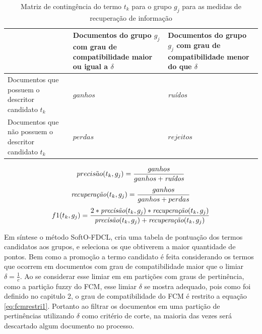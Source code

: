 \begin{table}[!htp]
  \centering
  \begin{tabular}{ |p{5cm}|p{5cm}|p{5cm}|}
    \cline{2-3}
    \multicolumn{1}{p{5cm}|}{} & Documentos do grupo $g_j$ com grau de compatibilidade 
    maior ou igual a $\delta$ &
    Documentos do grupo $g_j$ com grau de compatibilidade menor do que $\delta$ \\
    \hline
    Documentos que possuem o descritor candidato $t_k$ & \parbox[c]{5cm}{\centering $ganhos$} &
    \parbox[c]{5cm}{\centering \it ruídos\/} \\
    \hline
    Documentos que não possuem o descritor candidato $t_k$ & \parbox[c]{5cm}{\centering $perdas$} &
    \parbox[c]{5cm}{\centering $rejeitos$} \\
    \hline
  \end{tabular}
  \caption{Matriz de contingência do termo $t_k$ para o grupo $g_j$ para as medidas de recuperação
  de informação}
  \label{table:softmatrix}
\end{table}

\begin{equation}
  precis\tilde{a}o(t_k,g_j) = \frac{ganhos}{ganhos + \text{\it ruídos}}
  \label{eq:precision}
\end{equation}
\begin{equation}
  \text{\it recuperação\/}(t_k,g_j) = \frac{ganhos}{ganhos + perdas}
  \label{eq:recall}
\end{equation}
\begin{equation}
  f1(t_k,g_j) = \frac{2 * \text{\it precisão}(t_k,g_j) * \text{\it recuperação}(t_k,g_j)}
  {\text{\it precisão}(t_k,g_j) + \text{\it recuperação}(t_k,g_j)}
  \label{eq:fmeasure}
\end{equation}

Em síntese o método SoftO-FDCL, cria uma tabela de pontuação dos termos candidatos aos grupos,
e seleciona os que obtiverem a maior quantidade de pontos. Bem como a promoção a termo candidato é
feita considerando os termos que ocorrem em documentos com grau de compatibilidade maior que o
limiar $\delta = \frac{1}{c}$. Ao se considerar esse limiar em em partições com graus de
pertinência, como a partição fuzzy do FCM, esse limiar $\delta$ se mostra adequado, pois como foi
definido no capitulo 2, o grau de compatibilidade do FCM é restrito a equação \ref{eq:fcmrestri1}.
Portanto ao filtrar os documentos em uma partição de pertinências utilizando $\delta$ como critério
de corte, na maioria das vezes será descartado algum documento no processo. 

